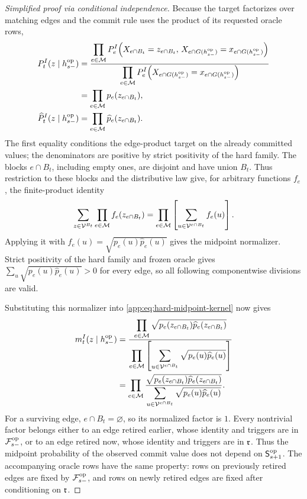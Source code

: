 {\begin{proof}[Simplified proof via conditional independence]
Because the target factorizes over matching edges and the commit rule uses
the product of its requested oracle rows,
\begin{align*}
 P_{t}^{I}(z\mid h^{\mathrm{op}}_{s-})
 &=
 \frac{\displaystyle
  \prod_{e\in\mathcal M}
   P_{e}^{I}\!\left(
    X_{e\cap B_t}=z_{e\cap B_t},\,
    X_{e\cap G(h^{\mathrm{op}}_{s-})}
      =x_{e\cap G(h^{\mathrm{op}}_{s-})}\right)}
 {\displaystyle
  \prod_{e\in\mathcal M}
   P_{e}^{I}\!\left(
    X_{e\cap G(h^{\mathrm{op}}_{s-})}
      =x_{e\cap G(h^{\mathrm{op}}_{s-})}\right)}\\
 &=\prod_{e\in\mathcal M}p_e(z_{e\cap B_t}),\\
 \widehat P_{t}^{I}(z\mid h^{\mathrm{op}}_{s-})
 &=\prod_{e\in\mathcal M}\widehat p_e(z_{e\cap B_t}).
\end{align*}
The first equality conditions the edge-product target on the already
committed values; the denominators are positive by strict positivity of the
hard family.
The blocks \(e\cap B_t\), including empty ones, are disjoint and have union
\(B_t\).  Thus restriction to these blocks and the distributive law give,
for arbitrary functions \(f_e\), the finite-product identity
\[
 \sum_{z\in\mathcal V^{B_t}}
   \prod_{e\in\mathcal M}f_e(z_{e\cap B_t})
 =
 \prod_{e\in\mathcal M}
   \left[
    \sum_{u\in\mathcal V^{e\cap B_t}}f_e(u)
   \right].
\]
Applying it with \(f_e(u)=\sqrt{p_e(u)\widehat p_e(u)}\) gives the
midpoint normalizer.  Strict positivity of the hard family and frozen oracle
gives
\(\sum_u\sqrt{p_e(u)\widehat p_e(u)}>0\) for every edge, so all following
componentwise divisions are valid.

Substituting this normalizer into
\cref{app:eq:hard-midpoint-kernel} now gives
\[
\begin{aligned}
 m_{t}^{I}
   (z\mid h^{\mathrm{op}}_{s-})
 &=\frac{\displaystyle
    \prod_{e\in\mathcal M}
       \sqrt{p_e(z_{e\cap B_t})\widehat p_e(z_{e\cap B_t})}}
   {\displaystyle
    \prod_{e\in\mathcal M}
     \left[
      \sum_{u\in\mathcal V^{e\cap B_t}}
       \sqrt{p_e(u)\widehat p_e(u)}
     \right]}\\
 &=\prod_{e\in\mathcal M}
   \frac{\sqrt{p_e(z_{e\cap B_t})\widehat p_e(z_{e\cap B_t})}}
        {\displaystyle
         \sum_{u\in\mathcal V^{e\cap B_t}}
           \sqrt{p_e(u)\widehat p_e(u)}}.
\end{aligned}
\]
For a surviving edge, \(e\cap B_t=\varnothing\), so its normalized factor
is \(1\).  Every nontrivial factor belongs either to an edge retired earlier,
whose identity and triggers are in \(\mathcal F^{\mathrm{op}}_{s-}\), or to an edge retired
now, whose identity and triggers are in \(\mathfrak r\).  Thus the midpoint
probability of the observed commit value does not depend on
\(\mathsf S^{\mathrm{op}}_{s+1}\).  The accompanying oracle rows have the same
property: rows on previously retired edges are fixed by
\(\mathcal F^{\mathrm{op}}_{s-}\), and rows on newly retired edges are fixed after
conditioning on \(\mathfrak r\).


\end{proof}}
